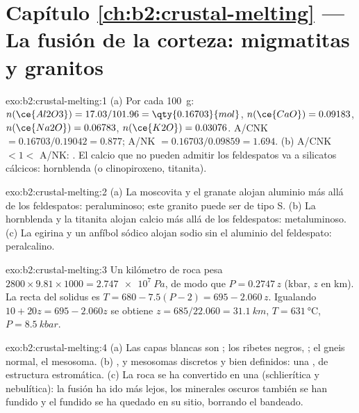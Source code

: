 \section*{Capítulo \ref{ch:b2:crustal-melting} --- La fusión de la corteza: migmatitas y granitos}

\begin{solution}{exo:b2:crustal-melting:1}
(a) Por cada \qty{100}{\gram}: $n(\ce{Al2O3}) = 17.03/101.96 = \qty{0.16703}{mol}$,
$n(\ce{CaO}) = 0.09183$, $n(\ce{Na2O}) = 0.06783$, $n(\ce{K2O}) = 0.03076$.
A/CNK $= 0.16703/0.19042 = 0.877$; A/NK $= 0.16703/0.09859 = 1.694$.
(b) A/CNK $< 1 <$ A/NK: . El calcio que no pueden admitir los feldespatos va a
silicatos cálcicos: hornblenda (o clinopiroxeno, titanita).
\end{solution}

\begin{solution}{exo:b2:crustal-melting:2}
(a) La moscovita y el granate alojan aluminio más allá de los feldespatos: peraluminoso; este granito
puede ser de tipo S. (b) La hornblenda y la titanita alojan calcio más allá de los feldespatos:
metaluminoso. (c) La egirina y un anfíbol sódico alojan sodio sin el aluminio
del feldespato: peralcalino.
\end{solution}

\begin{solution}{exo:b2:crustal-melting:3}
Un kilómetro de roca pesa $2800\times9.81\times1000 = \qty{2.747e7}{Pa}$, de modo que
$P = 0.2747\,z$ (\unit{kbar}, $z$ en \unit{km}). La recta del solidus es $T = 680 - 7.5(P -
2) = 695 - 2.060\,z$. Igualando $10 + 20z = 695 - 2.060z$ se obtiene $z = 685/22.060 =
\qty{31.1}{km}$, $T = \qty{631}{\celsius}$, $P = \qty{8.5}{kbar}$.
\end{solution}

\begin{solution}{exo:b2:crustal-melting:4}
(a) Las capas blancas son ; los ribetes negros, ; el gneis normal, el
mesosoma. (b) ,  y mesosomas discretos y bien definidos: una ,
de estructura estromática. (c) La roca se ha convertido en una  (schlierítica y nebulítica):
la fusión ha ido más lejos, los minerales oscuros también se han fundido y el fundido se ha quedado en su sitio,
borrando el bandeado.
\end{solution}

